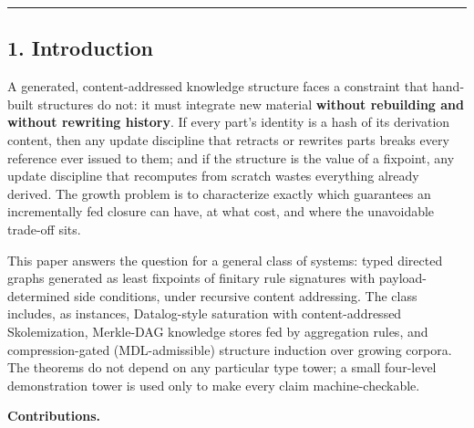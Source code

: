 \documentclass[
  10pt,
]{article}
\begin{document}
\begin{center}\rule{0.5\linewidth}{0.5pt}\end{center}

\hypertarget{introduction}{%
\subsection{1. Introduction}\label{introduction}}

A generated, content-addressed knowledge structure faces a constraint
that hand-built structures do not: it must integrate new material
\textbf{without rebuilding and without rewriting history}. If every
part's identity is a hash of its derivation content, then any update
discipline that retracts or rewrites parts breaks every reference ever
issued to them; and if the structure is the value of a fixpoint, any
update discipline that recomputes from scratch wastes everything already
derived. The growth problem is to characterize exactly which guarantees
an incrementally fed closure can have, at what cost, and where the
unavoidable trade-off sits.

This paper answers the question for a general class of systems: typed
directed graphs generated as least fixpoints of finitary rule signatures
with payload-determined side conditions, under recursive content
addressing. The class includes, as instances, Datalog-style saturation
with content-addressed Skolemization, Merkle-DAG knowledge stores fed by
aggregation rules, and compression-gated (MDL-admissible) structure
induction over growing corpora. The theorems do not depend on any
particular type tower; a small four-level demonstration tower is used
only to make every claim machine-checkable.

\textbf{Contributions.}
\end{document}
